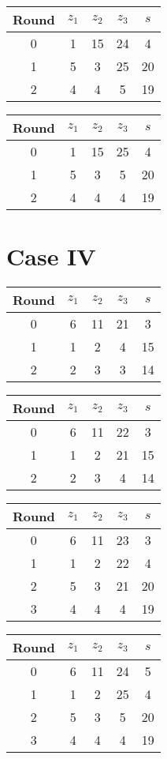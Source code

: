 \begin{tabular}{c | c | c | c | c }
Round & $z_1$ & $z_2$ & $z_3$ & $s$ \\
\hline
0 & 1 & 15 & 24 & 4 \\
1 & 5 & 3 & 25 & 20 \\
2 & 4 & 4 & 5 & 19
\end{tabular}

\begin{tabular}{c | c | c | c | c }
Round & $z_1$ & $z_2$ & $z_3$ & $s$ \\
\hline
0 & 1 & 15 & 25 & 4 \\
1 & 5 & 3 & 5 & 20 \\
2 & 4 & 4 & 4 & 19
\end{tabular}


\section{Case IV}

\begin{tabular}{c | c | c | c | c }
Round & $z_1$ & $z_2$ & $z_3$ & $s$ \\
\hline
0 & 6 & 11 & 21 & 3 \\
1 & 1 & 2 & 4 & 15 \\
2 & 2 & 3 & 3 & 14
\end{tabular}

\begin{tabular}{c | c | c | c | c }
Round & $z_1$ & $z_2$ & $z_3$ & $s$ \\
\hline
0 & 6 & 11 & 22 & 3 \\
1 & 1 & 2 & 21 & 15 \\
2 & 2 & 3 & 4 & 14
\end{tabular}

\begin{tabular}{c | c | c | c | c }
Round & $z_1$ & $z_2$ & $z_3$ & $s$ \\
\hline
0 & 6 & 11 & 23 & 3 \\
1 & 1 & 2 & 22 & 4 \\
2 & 5 & 3 & 21 & 20 \\
3 & 4 & 4 & 4 & 19
\end{tabular}

\begin{tabular}{c | c | c | c | c }
Round & $z_1$ & $z_2$ & $z_3$ & $s$ \\
\hline
0 & 6 & 11 & 24 & 5 \\
1 & 1 & 2 & 25 & 4 \\
2 & 5 & 3 & 5 & 20 \\
3 & 4 & 4 & 4 & 19
\end{tabular}

